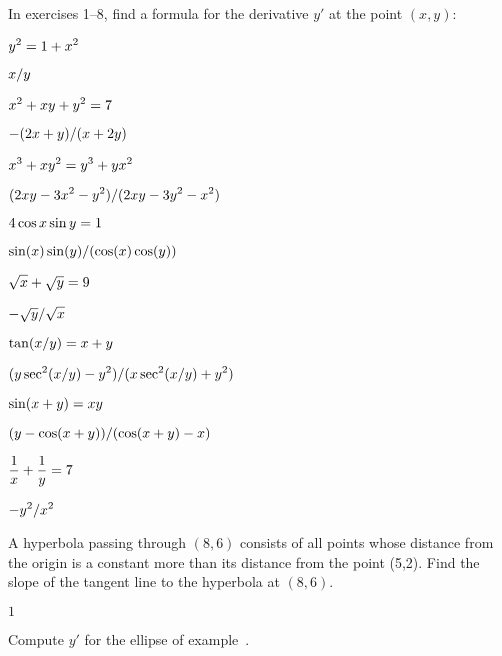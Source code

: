 \begin{exercises}

In exercises 1--8, find a formula for the derivative $y'$ at the point
$(x,y)$:

\exercise $\displaystyle y^2=1+x^2$
\begin{answer} $\displaystyle x/y$
\end{answer}

\exercise $\displaystyle x^2+xy+y^2=7$
\begin{answer} $\displaystyle -(2x+y)/(x+2y)$
\end{answer}

\exercise $\displaystyle x^3+xy^2=y^3+yx^2$
\begin{answer} $\displaystyle (2xy-3x^2-y^2)/(2xy-3y^2-x^2)$
\end{answer}

\exercise  $\displaystyle 4\cos x \sin y = 1$
\begin{answer} $\displaystyle \sin(x)\sin(y)/(\cos(x)\cos(y))$
\end{answer}

\exercise $\displaystyle\sqrt{x} + \sqrt{y} = 9$
\begin{answer} $\displaystyle-\sqrt{y}/\sqrt{x}$
\end{answer}

\exercise $\displaystyle \tan(x/y) = x+ y$
 \begin{answer} $\displaystyle (y\sec^2(x/y)-y^2)/(x\sec^2(x/y)+y^2)$
\end{answer}

\exercise $\displaystyle \sin (x+y ) =xy$
 \begin{answer} $\displaystyle (y-\cos(x+y))/(\cos(x+y)-x)$
\end{answer}

\exercise $\displaystyle{1\over x} + {1\over y} = 7$
\begin{answer} $\displaystyle -y^2/x^2$
\end{answer}

\exercise
A hyperbola passing through $(8,6)$ consists of all points whose distance
from the origin is a constant more than its distance from the point (5,2).
Find the slope of the tangent line to the hyperbola at $(8,6)$.
\begin{answer} $1$
\end{answer}

\exercise
Compute $y'$ for the ellipse of example~.


\end{exercises}

